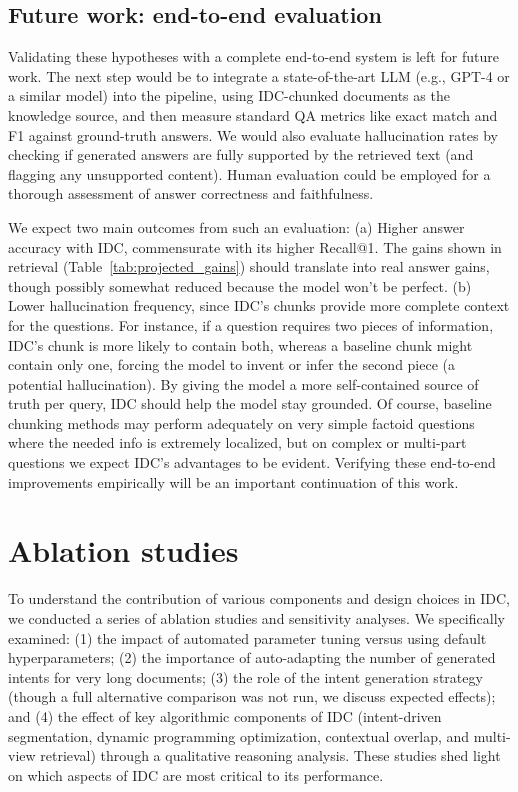 \documentclass[12pt,a4paper]{report}
\begin{document}
\subsection{Future work: end-to-end evaluation}\label{sec:future-e2e}

Validating these hypotheses with a complete end-to-end system is left for future work. The next step would be to integrate a state-of-the-art LLM (e.g., GPT-4 or a similar model) into the pipeline, using IDC-chunked documents as the knowledge source, and then measure standard QA metrics like exact match and F1 against ground-truth answers. We would also evaluate hallucination rates by checking if generated answers are fully supported by the retrieved text (and flagging any unsupported content). Human evaluation could be employed for a thorough assessment of answer correctness and faithfulness.

We expect two main outcomes from such an evaluation: (a) Higher answer accuracy with IDC, commensurate with its higher Recall@1. The gains shown in retrieval (Table~\ref{tab:projected_gains}) should translate into real answer gains, though possibly somewhat reduced because the model won't be perfect. (b) Lower hallucination frequency, since IDC's chunks provide more complete context for the questions. For instance, if a question requires two pieces of information, IDC's chunk is more likely to contain both, whereas a baseline chunk might contain only one, forcing the model to invent or infer the second piece (a potential hallucination). By giving the model a more self-contained source of truth per query, IDC should help the model stay grounded. Of course, baseline chunking methods may perform adequately on very simple factoid questions where the needed info is extremely localized, but on complex or multi-part questions we expect IDC's advantages to be evident. Verifying these end-to-end improvements empirically will be an important continuation of this work.

\section{Ablation studies}\label{sec:ablation}

To understand the contribution of various components and design choices in IDC, we conducted a series of ablation studies and sensitivity analyses. We specifically examined: (1) the impact of automated parameter tuning versus using default hyperparameters; (2) the importance of auto-adapting the number of generated intents for very long documents; (3) the role of the intent generation strategy (though a full alternative comparison was not run, we discuss expected effects); and (4) the effect of key algorithmic components of IDC (intent-driven segmentation, dynamic programming optimization, contextual overlap, and multi-view retrieval) through a qualitative reasoning analysis. These studies shed light on which aspects of IDC are most critical to its performance.
\end{document}

